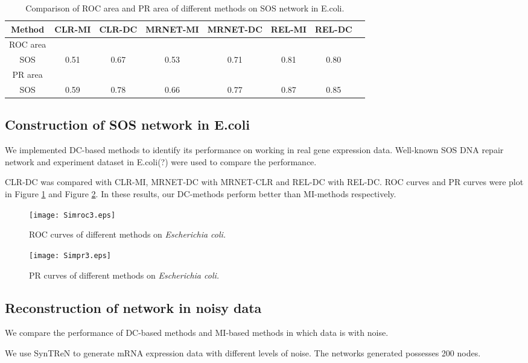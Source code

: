 \documentclass{bioinfo}
\begin{document}
\begin{table}[0.5\textwidth] \tiny
\centering \caption{Comparison of ROC area and PR area of different methods on SOS network in E.coli.}\label{roc-pr}
\begin{tabular}{cccccccc}
 \hline
 Method & CLR-MI & CLR-DC & MRNET-MI & MRNET-DC & REL-MI & REL-DC \\
 \hline
  ROC area\\
  SOS     & 0.51 & 0.67 & 0.53 & 0.71 & 0.81 & 0.80 \\
 PR area\\
  SOS   & 0.59 &0.78 & 0.66 & 0.77 & 0.87 & 0.85 \\
  \hline
\end{tabular}
\end{table}

\subsection{Construction of SOS network in E.coli}
We implemented DC-based methods to identify its performance on
working in real gene expression data. Well-known SOS DNA repair
network and experiment dataset in E.coli(?) were used to compare the
performance.

CLR-DC was compared with CLR-MI, MRNET-DC with MRNET-CLR and REL-DC
with REL-DC. ROC curves and PR curves were plot in Figure
\ref{roc-sos} and Figure \ref{pr-sos}. In these results, our
DC-methods perform better than MI-methods respectively.

\begin{figure}[!h]
  \texttt{[image: Simroc3.eps]}
  \caption{ROC curves of different methods on \emph{Escherichia coli.}}\label{roc-sos}
\end{figure}

\begin{figure}[!h]
  \texttt{[image: Simpr3.eps]}
  \caption{PR curves of different methods on \emph{Escherichia coli.}}\label{pr-sos}
\end{figure}

\subsection{Reconstruction of network in noisy data}
We compare the performance of DC-based methods and MI-based methods
in which data is with noise.

  We use SynTReN to generate mRNA expression data with different
levels of noise. The networks generated possesses 200 nodes.
\end{document}
